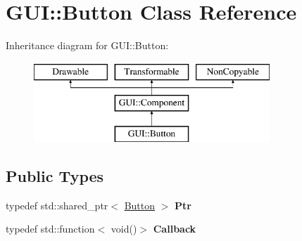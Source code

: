 \hypertarget{class_g_u_i_1_1_button}{}\section{G\+U\+I\+:\+:Button Class Reference}
\label{class_g_u_i_1_1_button}
Inheritance diagram for G\+U\+I\+:\+:Button\+:\begin{figure}[H]
\begin{center}
\leavevmode
\includegraphics[height=3.000000cm]{class_g_u_i_1_1_button}
\end{center}
\end{figure}
\subsection*{Public Types}
\begin{DoxyCompactItemize}
\item 
\hypertarget{class_g_u_i_1_1_button_a910df9f7797f35d65b43da4dd392f1de}{}typedef std\+::shared\+\_\+ptr$<$ \hyperlink{class_g_u_i_1_1_button}{Button} $>$ {\bfseries Ptr}\label{class_g_u_i_1_1_button_a910df9f7797f35d65b43da4dd392f1de}

\item 
\hypertarget{class_g_u_i_1_1_button_a2d7e2cb4d20f8789a779a4133fe4c678}{}typedef std\+::function$<$ void()$>$ {\bfseries Callback}\label{class_g_u_i_1_1_button_a2d7e2cb4d20f8789a779a4133fe4c678}

\end{DoxyCompactItemize}
